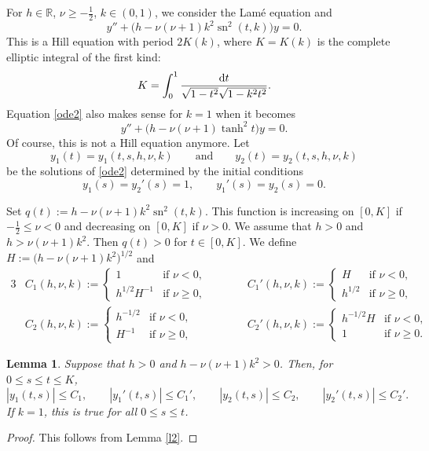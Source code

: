 \documentclass[pdftex]{sigma}
\newcommand{\R}{\mathbb{R}}
\DeclareMathOperator{\sn}{sn}
\numberwithin{equation}{section}
\newtheorem{Lemma}[Theorem]{Lemma}
\begin{document}
For $h\in \R$, $\nu\ge -\frac12$, $k\in(0,1)$, we consider the Lam\'e equation \cite[Section~IX]{A} and \cite[Section~XV]{EMO}%
\begin{equation}\label{ode2}
y''+\bigl(h-\nu(\nu+1)k^2\sn^2(t,k)\bigr) y=0 .
\end{equation}
This is a Hill equation with period $2K(k)$, where $K=K(k)$
is the complete elliptic integral of the first kind:
\[
K=\int_0^1\frac{{\rm d}t}{\sqrt{1-t^2}\sqrt{1-k^2t^2}}.
\]
Equation \eqref{ode2} also makes sense for $k=1$ \cite[Section~22.5\,(ii)]{dlmf} when it becomes
\begin{equation}\label{ode3}
y''+\bigl(h-\nu(\nu+1)\tanh^2 t\bigr) y=0 .
\end{equation}
Of course, this is not a Hill equation anymore.
Let
\[
y_1(t)=y_1(t,s,h,\nu,k) \qquad \text{and} \qquad y_2(t)=y_2(t,s,h,\nu,k)
\]
 be the solutions of \eqref{ode2}
determined by the initial conditions
\[
y_1(s)=y_2'(s)=1, \qquad y_1'(s)=y_2(s)=0.
\]

Set $q(t):=h-\nu(\nu+1)k^2\sn^2(t,k)$. This function is increasing on $[0,K]$ if $-\frac12\le \nu<0$ and decreasing
on $[0,K]$ if $\nu>0$.
We assume that $h>0$ and $h>\nu(\nu+1)k^2$. Then $q(t)>0$ for $t\in[0,K]$.
We define $H:=\bigl(h-\nu(\nu+1)k^2\bigr)^{1/2}$ and
\begin{alignat*}{3}%
& C_1(h,\nu,k):=\begin{cases} 1 & \text{if $\nu<0$},\\h^{1/2}H^{-1} & \text{if $\nu\ge0$},
\end{cases}&&\qquad
C_1'(h,\nu,k):=\begin{cases} H & \text{if $\nu<0$},\\h^{1/2} & \text{if $\nu\ge0$},
\end{cases}& \\
& C_2(h,\nu,k):=\begin{cases} h^{-1/2} & \text{if $\nu<0$},\\H^{-1} & \text{if $\nu\ge0$},
\end{cases}&& \qquad
C_2'(h,\nu,k):=\begin{cases} h^{-1/2} H & \text{if $\nu<0$},\\1 & \text{if $\nu\ge0$}.
\end{cases}&
\end{alignat*}

\begin{Lemma}\label{l3}
Suppose that $h>0$ and $h-\nu(\nu+1)k^2>0$. Then, for $0\le s\le t\le K$,
\[
 |y_1(t,s)|\le C_1,\qquad
 |y_1'(t,s)|\le C_1',\qquad |y_2(t,s)|\le C_2, \qquad |y_2'(t,s)|\le C_2'.
\]
If $k=1$, this is true for all $0\le s\le t$.
\end{Lemma}
\begin{proof}
This follows from Lemma \ref{l2}.
\end{proof}
\end{document}
